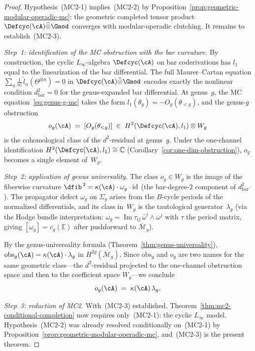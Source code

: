 \begin{proof}
Hypothesis~(MC2-1) implies~(MC2-2) by
Proposition~\ref{prop:geometric-modular-operadic-mc}: the geometric
completed tensor product
$\Defcyc(\cA) \widehat{\otimes} \Gmod$ converges with
modular-operadic clutching.  It remains to establish~(MC2-3).

\medskip\noindent
\emph{Step~1: identification of the MC obstruction with the bar
curvature.}
By construction, the cyclic $L_\infty$-algebra $\Defcyc(\cA)$ on bar
coderivations has $l_1$ equal to the linearization of the bar
differential.  The full Maurer--Cartan equation
$\sum_n \frac{1}{n!}\,\hat{l}_n(\Theta^{\otimes n}) = 0$ in
$\Defcyc(\cA)\widehat{\otimes}\Gmod$ encodes exactly the nonlinear
condition $d_{\mathrm{bar}}^2 = 0$ for the genus-expanded bar
differential.  At genus~$g$, the MC equation~\eqref{eq:genus-g-mc}
takes the form $l_1(\theta_g) = -O_g(\theta_{<g})$, and the
genus-$g$ obstruction
\[
  o_g(\cA)
  \;=\;
  [O_g(\theta_{<g})]
  \;\in\;
  H^2(\Defcyc(\cA), l_1) \otimes W_g
\]
is the cohomological class of the $d^2$-residual at genus~$g$.
Under the one-channel identification
$H^2(\Defcyc(\cA), l_1) \cong \mathbb{C}$
(Corollary~\ref{cor:one-dim-obstruction}), $o_g$ becomes a single
element of~$W_g$.

\medskip\noindent
\emph{Step~2: application of genus universality.}
The class $o_g \in W_g$ is the image of the fiberwise curvature
$\dfib^{\,2} = \kappa(\cA) \cdot \omega_g \cdot \mathrm{id}$
(the bar-degree-$2$ component of $d_{\mathrm{bar}}^2$).  The
propagator defect $\omega_g$ on $\Sigma_g$ arises from the
$B$-cycle periods of the normalized differentials, and its class
in~$W_g$ is the tautological generator~$\lambda_g$ (via the
Hodge bundle interpretation:
$\omega_g = \operatorname{Im}\tau_{ij}\,\bar{\omega}^i\wedge\omega^j$
with $\tau$ the period matrix, giving
$[\omega_g] = c_g(\mathbb{E})$ after pushforward to
$\overline{\mathcal{M}}_g$).

By the genus-universality formula
(Theorem~\ref{thm:genus-universality}),
$\mathrm{obs}_g(\cA) = \kappa(\cA)\cdot\lambda_g$ in
$H^{2g}(\overline{\mathcal{M}}_g)$.
Since $\mathrm{obs}_g$ and $o_g$ are two names for the same
geometric class---the $d^2$-residual projected to the one-channel
obstruction space and then to the coefficient space $W_g$---we
conclude
\[
  o_g(\cA) \;=\; \kappa(\cA)\,\lambda_g.
\]

\medskip\noindent
\emph{Step~3: reduction of MC2.}
With~(MC2-3) established, Theorem~\ref{thm:mc2-conditional-completion}
now requires only~(MC2-1): the cyclic $L_\infty$ model.
Hypothesis~(MC2-2) was already resolved conditionally on~(MC2-1) by
Proposition~\ref{prop:geometric-modular-operadic-mc}, and~(MC2-3) is
the present theorem.
\end{proof}

